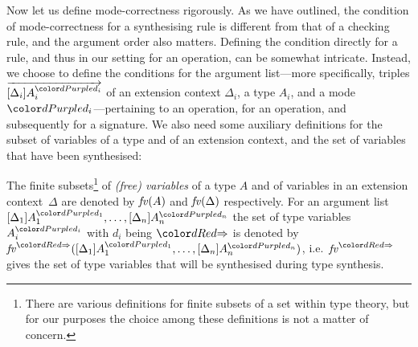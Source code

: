 Now let us define mode-correctness rigorously.
As we have outlined, the condition of mode-correctness for a synthesising rule is different from that of a checking rule, and the argument order also matters.
Defining the condition directly for a rule, and thus in our setting for an operation, can be somewhat intricate.
Instead, we choose to define the conditions for the argument list---more specifically, triples $\biargvec$ of an extension context $\Delta_i$, a type $A_i$, and a mode $\dir{d_i}$---pertaining to an operation, for an operation, and subsequently for a signature.
We also need some auxiliary definitions for the subset of variables of a type and of an extension context, and the set of variables that have been synthesised:
\begin{definition}
  The finite subsets\footnote{%
  There are various definitions for finite subsets of a set within type theory, but for our purposes the choice among these definitions is not a matter of concern.}
  of \emph{(free) variables} of a type $A$ and of variables in an extension context~$\Delta$ are denoted by $\mathit{fv}(A)$ and $\mathit{fv}(\Delta)$ respectively.
  For an argument list $\biargs$ the set of type variables $A_{i}^{\dir{d_i}}$ with $d_i$ being $\syn$ is denoted by $\synvar(\biargs)$, i.e.\ $\synvar$ gives the set of type variables that will be synthesised during type synthesis.
\end{definition}

